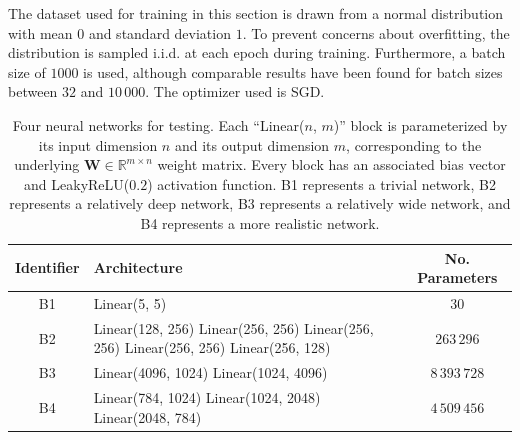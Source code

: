 \documentclass{article}
\theoremstyle{plain}
\theoremstyle{definition}
\theoremstyle{remark}
\newcommand{\vW}{\mathbf{W}}
\begin{document}
The dataset used for training in this section is drawn from a normal distribution with mean $0$ and standard deviation $1$. To prevent concerns about overfitting, the distribution is sampled i.i.d. at each epoch during training. Furthermore, a batch size of $1000$ is used, although comparable results have been found for batch sizes between $32$ and $10\,000$. The optimizer used is SGD.

\begin{table}[htbp]
    \begin{center}
        \begin{tabular}{|c|p{}|c|}
            \hline
            \textbf{Identifier} & \textbf{Architecture}                                                                                                    & \textbf{No. Parameters} \\
            \hline
            \hline
            B1                  & Linear(5, 5)                                                                                                             & $30$                    \\
            \hline
            B2                  & Linear(128, 256) \newline Linear(256, 256) \newline Linear(256, 256) \newline Linear(256, 256) \newline Linear(256, 128) & $263\,296$              \\
            \hline
            B3                  & Linear(4096, 1024) \newline Linear(1024, 4096)                                                                           & $8\,393\,728$           \\
            \hline
            B4                  & Linear(784, 1024) \newline Linear(1024, 2048) \newline Linear(2048, 784)                                                 & $4\,509\,456$           \\
            \hline
        \end{tabular}
        \vspace{5pt}
        \caption{Four neural networks for testing. Each ``Linear($n$, $m$)'' block is parameterized by its input dimension $n$ and its output dimension $m$, corresponding to the underlying $\vW \in \mathbb{R}^{m \times n}$ weight matrix. Every block has an associated bias vector and LeakyReLU($0.2$) activation function. B1 represents a trivial network, B2 represents a relatively deep network, B3 represents a relatively wide network, and B4 represents a more realistic network.}
        \label{tab:networks}
    \end{center}
\end{table}
\end{document}
